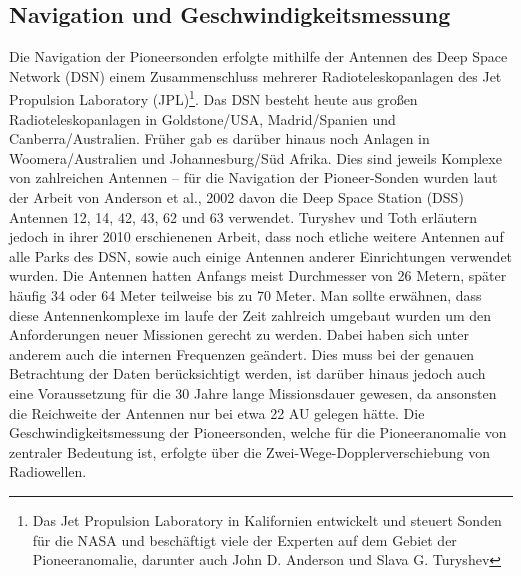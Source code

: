 
\subsection{Navigation und Geschwindigkeitsmessung}\label{messung}
Die Navigation der Pioneersonden erfolgte mithilfe der Antennen des Deep Space Network (DSN) einem Zusammenschluss mehrerer Radioteleskopanlagen des Jet Propulsion Laboratory (JPL)\footnote{Das Jet Propulsion Laboratory in Kalifornien entwickelt und steuert Sonden für die NASA und beschäftigt viele der Experten auf dem Gebiet der Pioneeranomalie, darunter auch John D. Anderson und Slava G. Turyshev}. Das DSN besteht heute aus großen Radioteleskopanlagen in Goldstone/USA, Madrid/Spanien und Canberra/Australien. Früher gab es darüber hinaus noch Anlagen in Woomera/Australien und Johannesburg/Süd Afrika.\cite{Anderson2002}\cite{Turyshev2010} Dies sind jeweils Komplexe von zahlreichen Antennen – für die Navigation der Pioneer-Sonden wurden laut der Arbeit von Anderson et al., 2002\cite{Anderson2002} davon die Deep Space Station (DSS) Antennen 12, 14, 42, 43, 62 und 63 verwendet. Turyshev und Toth erläutern jedoch in ihrer 2010 erschienenen Arbeit, dass noch etliche weitere Antennen auf alle Parks des DSN, sowie auch einige Antennen anderer Einrichtungen verwendet wurden.\cite{Turyshev2010} Die Antennen hatten Anfangs meist Durchmesser von 26 Metern, später häufig 34 oder 64 Meter teilweise bis zu 70 Meter.\cite{Turyshev2010}
Man sollte erwähnen, dass diese Antennenkomplexe im laufe der Zeit zahlreich umgebaut wurden um den Anforderungen neuer Missionen gerecht zu werden. Dabei haben sich unter anderem auch die internen Frequenzen geändert\cite{Anderson2002}. Dies muss bei der genauen Betrachtung der Daten berücksichtigt werden, ist darüber hinaus jedoch auch eine Voraussetzung für die 30 Jahre lange Missionsdauer gewesen, da ansonsten die Reichweite der Antennen nur bei etwa 22 AU gelegen hätte.\cite{Turyshev2010}
Die Geschwindigkeitsmessung der Pioneersonden, welche für die Pioneeranomalie von zentraler Bedeutung ist, erfolgte über die Zwei-Wege-Dopplerverschiebung von Radiowellen.

